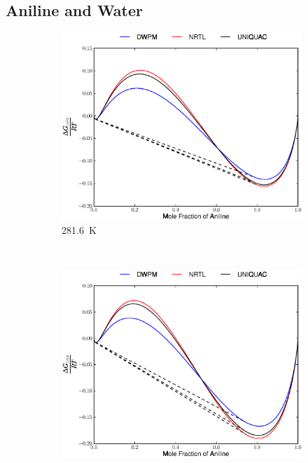 \subsection{Aniline and Water}
\vspace*{\fill}
\begin{figure}[hp]
\begin{subfigure}[h]{0.5\textwidth}
	\centering
	\includegraphics[width = \textwidth]{Results_Parts/BinaryParams/aniline-water/AllModelsGibbsPlots/T_281.6.eps}
	\caption{281.6~$\mathrm{K}$} 
\end{subfigure}%
~%
\begin{subfigure}[h]{0.5\textwidth}
	\centering
	\includegraphics[width = \textwidth]{Results_Parts/BinaryParams/aniline-water/AllModelsGibbsPlots/T_298.4.eps}

\end{subfigure}
\end{figure}
